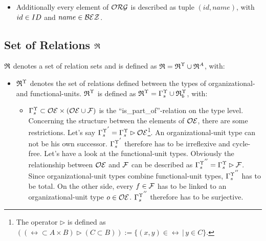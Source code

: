 \begin{itemize}
	\item Additionally every element of $\mathcal{ORG}$ is described as tuple $(id, name)$, with $id \in ID$ and $name \in \mathcal{BEZ}$.

	\end{itemize}

\subsection{Set of Relations $\mathfrak{R}$}
	$\mathfrak{R}$ denotes a set of relation sets and is defined as
	$\mathfrak{R} = {\mathfrak{R}}^{\Upsilon} \cup {\mathfrak{R}}^{A}$, with:

	\begin{itemize}

	\item ${\mathfrak{R}}^{\Upsilon}$ denotes the set of relations defined between the types of organizational- and functional-units.
	${\mathfrak{R}}^{\Upsilon}$ is defined as ${\mathfrak{R}}^{\Upsilon} = {\Gamma}^{\Upsilon}_{s} \cup {\mathfrak{R}}^{\Upsilon}_{b}$, with:
	\begin{itemize}

		\item ${\Gamma}^{\Upsilon}_{s} \subset \mathcal{OE} \times (\mathcal{OE} \cup \mathcal{F})$ is the ``is\_part\_of''-relation on the type level. Concerning the structure between the elements of $\mathcal{OE}$, there are some restrictions. Let's say ${{\Gamma}^{\Upsilon}_{s}}^{'} = {\Gamma}^{\Upsilon}_{s} \rhd \mathcal{OE}$\footnote{The operator $\rhd$ is defined as $((\rel \subset A \times B) \rhd (C \subset B)) := \{(x,y) \in \rel \, \vert \, y \in C \}$.}.
		An organizational-unit type can not be his own successor. ${{\Gamma}^{\Upsilon}_{s}}^{'}$ therefore has to be irreflexive and cycle-free.
		Let's have a look at the functional-unit types. Obviously the relationship between $\mathcal{OE}$ and $\mathcal{F}$ can be described as ${{\Gamma}^{\Upsilon}_{s}}^{''} = {\Gamma}^{\Upsilon}_{s} \rhd \mathcal{F}$. Since organizational-unit types combine functional-unit types, ${{\Gamma}^{\Upsilon}_{s}}^{''}$ has to be total. On the other side, every $f \in \mathcal{F}$ has to be linked to an organizational-unit type $o \in \mathcal{OE}$. ${{\Gamma}^{\Upsilon}_{s}}^{''}$ therefore has to be surjective.


\end{itemize}
\end{itemize}
